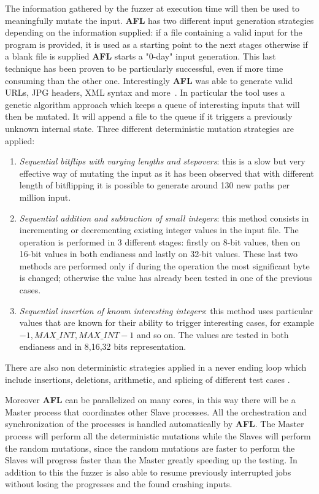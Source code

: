 \documentclass[../main.tex]{subfiles}
\begin{document}
The information gathered by the fuzzer at execution time will then be used to meaningfully mutate the input. \textbf{AFL} has two different input generation strategies depending on the information supplied: if a file containing a valid input for the program is provided, it is used as a starting point to the next stages otherwise if a blank file is supplied \textbf{AFL} starts a "0-day" input generation. This last technique has been proven to be particularly successful, even if more time consuming than the other one. Interestingly \textbf{AFL} was able to generate valid URLs, JPG headers, XML syntax and more~\cite{aflblog}. In particular the tool uses a genetic algorithm approach which keeps a queue of interesting inputs that will then be mutated. It will append a file to the queue if it triggers a previously unknown internal state. Three different deterministic mutation strategies are applied:
\begin{enumerate}
  \item \textit{Sequential bitflips with varying lengths and stepovers}: this is a slow but very effective way of mutating the input as it has been observed that with different length of bitflipping it is possible to generate around 130 new paths per million input.
  \item \textit{Sequential addition and subtraction of small integers}: this method consists in incrementing or decrementing existing integer values in the input file. The operation is performed in 3 different stages: firstly on 8-bit values, then on 16-bit values in both endianess and lastly on 32-bit values. These last two methods are performed only if during the operation the most significant byte is changed; otherwise the value has already been tested in one of the previous cases.
  \item \textit{Sequential insertion of known interesting integers}: this method uses particular values that are known for their ability to trigger interesting cases, for example $-1, MAX\_INT, MAX\_INT-1$ and so on. The values are tested in both endianess and in 8,16,32 bits representation.
\end{enumerate}

There are also non deterministic strategies applied in a never ending loop which include insertions, deletions, arithmetic, and splicing of different test cases \cite{afltech}.

Moreover \textbf{AFL} can be parallelized on many cores, in this way there will be a Master process that coordinates other Slave processes. All the orchestration and synchronization of the processes is handled automatically by \textbf{AFL}. The Master process will perform all the deterministic mutations while the Slaves will perform the random mutations, since the random mutations are faster to perform the Slaves will progress faster than the Master greatly speeding up the testing. In addition to this the fuzzer is also able to resume previously interrupted jobs without losing the progresses and the found crashing inputs.
\end{document}
